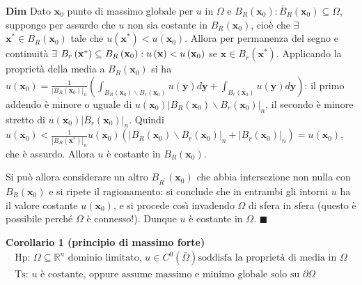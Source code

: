 \documentclass{article}
\begin{document}
\textbf{Dim} Dato $\mathbf{x}_{0}$ punto di massimo globale per $u$ in $%
\Omega $ e $B_{R}\left( \mathbf{x}_{0}\right) :\bar{B}_{R}\left( \mathbf{x}%
_{0}\right) \subseteq \Omega $, suppongo per assurdo che $u$ non sia
costante in $B_{R}\left( \mathbf{x}_{0}\right) $, cio\`{e} che $\exists $ $%
\mathbf{x}^{\ast }\in B_{R}\left( \mathbf{x}_{0}\right) $ tale che $u\left( 
\mathbf{x}^{\ast }\right) <u\left( \mathbf{x}_{0}\right) $. Allora per
permanenza del segno e continuit\`{a} $\exists $ $B_{r}\left( \mathbf{x}%
^{\ast }\right) \subseteq B_{R}\left( \mathbf{x}_{0}\right) :u\left( \mathbf{%
x}\right) <u\left( \mathbf{x}_{0}\right) $ se $\mathbf{x}\in B_{r}\left( 
\mathbf{x}^{\ast }\right) $. Applicando la propriet\`{a} della media a $%
B_{R}\left( \mathbf{x}_{0}\right) $ si ha $u\left( \mathbf{x}_{0}\right) =%
\frac{1}{\left\vert B_{R}\left( \mathbf{x}_{0}\right) \right\vert _{n}}%
\left( \int_{B_{R}\left( \mathbf{x}_{0}\right) \backslash B_{r}\left( 
\mathbf{x}_{0}\right) }u\left( \mathbf{y}\right) d\mathbf{y+}%
\int_{B_{r}\left( \mathbf{x}_{0}\right) }u\left( \mathbf{y}\right) d\mathbf{y%
}\right) $: il primo addendo \`{e} minore o uguale di $u\left( \mathbf{x}%
_{0}\right) \left\vert B_{R}\left( \mathbf{x}_{0}\right) \backslash
B_{r}\left( \mathbf{x}_{0}\right) \right\vert _{n}$, il secondo \`{e} minore
stretto di $u\left( \mathbf{x}_{0}\right) \left\vert B_{r}\left( \mathbf{x}%
_{0}\right) \right\vert _{n}$. Quindi $u\left( \mathbf{x}_{0}\right) <\frac{1%
}{\left\vert B_{R}\left( \mathbf{x}^{\ast }\right) \right\vert _{n}}u\left( 
\mathbf{x}_{0}\right) \left( \left\vert B_{R}\left( \mathbf{x}_{0}\right)
\backslash B_{r}\left( \mathbf{x}_{0}\right) \right\vert _{n}+\left\vert
B_{r}\left( \mathbf{x}_{0}\right) \right\vert _{n}\right) =u\left( \mathbf{x}%
_{0}\right) $, che \`{e} assurdo. Allora $u$ \`{e} costante in $B_{R}\left( 
\mathbf{x}_{0}\right) $.

Si pu\`{o} allora considerare un altro $B_{R^{\prime }}\left( \mathbf{x}%
_{0}\right) $ che abbia intersezione non nulla con $B_{R}\left( \mathbf{x}%
_{0}\right) $ e si ripete il ragionamento: si conclude che in entrambi gli
intorni $u$ ha il valore costante $u\left( \mathbf{x}_{0}\right) $, e si
procede cos\`{\i} invadendo $\Omega $ di sfera in sfera (questo \`{e}
possibile perch\'{e} $\Omega $ \`{e} connesso!). Dunque $u$ \`{e} costante
in $\Omega $. $\blacksquare $

\textbf{Corollario 1 (principio di massimo forte)}%
\begin{gather*}
\text{Hp: }\Omega \subseteq 
\mathbb{R}
^{n}\text{ dominio limitato, }u\in C^{0}\left( \bar{\Omega}\right) \text{
soddisfa la propriet\`{a} di media in }\Omega \\
\text{Ts: }u\text{ \`{e} costante, oppure assume
massimo e minimo globale solo su }\partial \Omega
\end{gather*}
\end{document}
